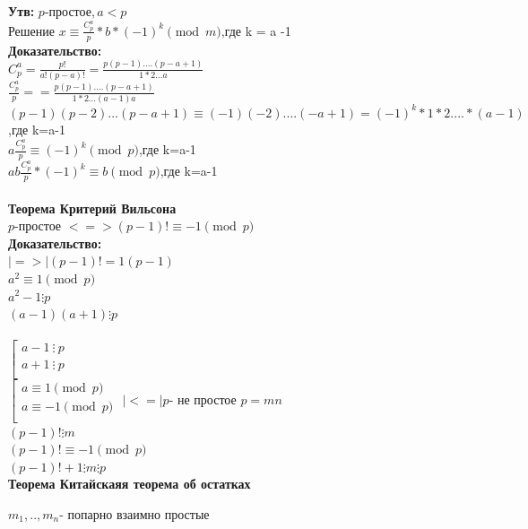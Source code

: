 \documentclass[12pt]{article}
\begin{document}
        \textbf{Утв:}
    $p$-простое$ , a<p $\\
        Решение  $x\equiv \frac{C_p^a}{p}*b*(-1)^k \pmod{m}$,где k = a -1\\
        \textbf{Доказательство:}\\
    $ C_p^a = \frac{p!}{a!(p-a)!}=\frac{p(p-1)....(p-a+1)}{1*2...a} $\\
    $\frac{C_p^a}{p}= =\frac{p(p-1)....(p-a+1)}{1*2...(a-1)a}$\\
    $(p-1)(p-2)...(p-a+1)\equiv (-1)(-2)....(-a+1) = (-1)^k*1*2....*(a-1)$,где k=a-1\\
    $a\frac{C_p^a}{p}\equiv (-1)^k \pmod{p}$,где k=a-1\\
    $ab\frac{C_p^a}{p} * (-1)^k\equiv b \pmod{p} $,где k=a-1\\
        \\
        \textbf{Теорема Критерий Вильсона}
        \\
    $p$-простое $<=> (p-1)! \equiv -1 \pmod{p} $\\
        \textbf{Доказательство:}\\
    $|=>|  (p-1)!= 1(p-1) $\\
    $a^2 \equiv 1 \pmod{p}$\\
    $a^2 -1 \vdots p$\\
    $(a-1)(a+1) \vdots p$\\
        \\
    $\left[ \begin{array}{l}
        a-1 \ \vdots\ p \\
        a+1 \ \vdots\ p \\
    \end{array} \right.
    $
        \\$\left[ \begin{array}{l}
            a \equiv 1 \pmod{p}  \\
            a \equiv -1 \pmod{p} \\
        \end{array} \right.
    $
    $|<=| p $- не простое $p = mn$\\
    $(p-1)!\vdots m $\\
    $(p-1)!\equiv -1 \pmod{p}$\\
    $(p-1)!+1\vdots m\vdots p $\\

    \textbf{Теорема Китайскаяя теорема об остатках}

    $m_1,..,m_n $- попарно взаимно простые \\
\end{document}
